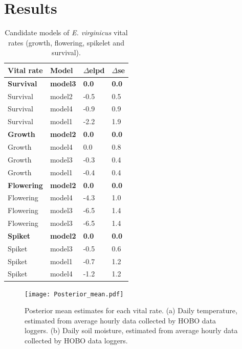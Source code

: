\documentclass[11pt]{article}
\begin{document}
\section*{Results}
\begin{table}[H]
\caption{Candidate models of  \emph{E. virginicus} vital rates (growth, flowering, spikelet and survival).}
\label{Table:models}
\bigskip{}
\centering
\begin{tabular}{llll}\hline
			    Vital rate   &      Model   &     $\Delta$elpd  &  $\Delta$se     \\ \hline
			 \textbf{Survival} &    \textbf{model3}   &     \textbf{0.0} &     \textbf{ 0.0}    \\
			Survival &     model2  & -0.5 &   0.5       \\
			Survival &   model4    & -0.9    &   0.9\\
			Survival & model1 & -2.2 & 1.9  \\
		     \textbf{Growth} &   \textbf{model2}&  \textbf{0.0} &  \textbf{0.0} \\
		    Growth & model4 & 0.0 &  0.8 \\
		    Growth & model3 & -0.3 &  0.4\\
		    Growth  &  model1& -0.4 & 0.4\\
		     \textbf{Flowering} &   \textbf{model2}&  \textbf{0.0}  &  \textbf{0.0}  \\
		    Flowering & model4 & -4.3 &  1.0\\
		    Flowering & model3 & -6.5 &  1.4\\
		     Flowering & model3 & -6.5 &  1.4\\
		    		     \textbf{Spiket} &   \textbf{model2}&  \textbf{0.0} &  \textbf{0.0}  \\
		    Spiket & model3 & -0.5 &  0.6\\
		    Spiket & model1 & -0.7&  1.2\\
		    Spiket  &  model4 & -1.2 & 1.2\\\hline			    				 			     			     
\end{tabular}
\end{table}

\begin{figure}[H]
\texttt{[image: Posterior\_mean.pdf]}
\caption{Posterior mean estimates for each vital rate. 
(a) Daily temperature, estimated from average hourly data collected by  HOBO data loggers. 
(b) Daily  soil moisture, estimated  from average hourly data  collected by  HOBO data loggers. 
}
\label{fig:climate}
\end{figure}
\end{document}
